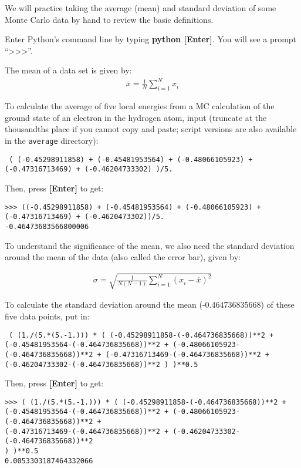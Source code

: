 We will practice taking the average (mean) and standard deviation of some Monte
Carlo data by hand to review the basic definitions.

Enter Python's command line by typing \textbf{python [Enter]}.
You will see a prompt ``\textgreater\textgreater\textgreater''.

The mean of a data set is given by:
\begin{align}
  \overline{x} = \frac{1}{N}\sum_{i=1}^{N} x_i
\end{align}

To calculate the average of five local energies from a MC calculation of the
ground state of an electron in the hydrogen atom, input (truncate at the
thousandths place if you cannot copy and paste; script versions are also
available in the \texttt{average} directory): 

\texttt{
(
(-0.45298911858) + 
(-0.45481953564) + 
(-0.48066105923) + 
(-0.47316713469) + 
(-0.46204733302)
)/5.
} 

Then, press \textbf{[Enter]} to get:

\begin{shaded} 
\begin{verbatim}
>>> ((-0.45298911858) + (-0.45481953564) + (-0.48066105923) + 
(-0.47316713469) + (-0.4620473302))/5.  
-0.46473683566800006
\end{verbatim}
\end{shaded}

To understand the significance of the mean, we also need the standard deviation
around the mean of the data (also called the error bar), given by:

\begin{align}
  \sigma = \sqrt{\frac{1}{N(N-1)}\sum_{i=1}^{N} ({x_i} - \overline{x})^2}
\end{align}

To calculate the standard deviation around the mean (-0.464736835668) of these
five data points, put in: 

\texttt{
( (1./(5.*(5.-1.))) * ( 
(-0.45298911858-(-0.464736835668))**2 + \\
(-0.45481953564-(-0.464736835668))**2 + 
(-0.48066105923-(-0.464736835668))**2 + 
(-0.47316713469-(-0.464736835668))**2 + 
(-0.46204733302-(-0.464736835668))**2 ) 
)**0.5
} 

Then, press \textbf{[Enter]} to get:

\begin{shaded}
\begin{verbatim}
>>> ( (1./(5.*(5.-1.))) * ( (-0.45298911858-(-0.464736835668))**2 +
(-0.45481953564-(-0.464736835668))**2 + (-0.48066105923-(-0.464736835668))**2 + 
(-0.47316713469-(-0.464736835668))**2 + (-0.46204733302-(-0.464736835668))**2 
) )**0.5
0.0053303187464332066
\end{verbatim}
\end{shaded}

